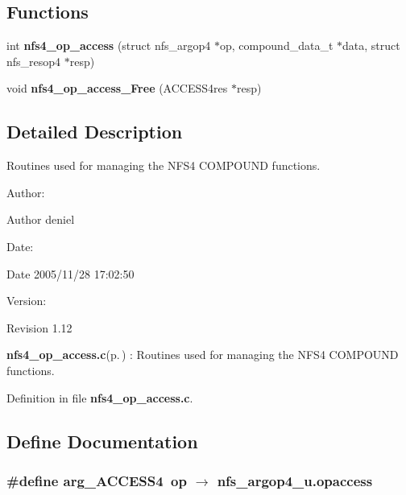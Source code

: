 \subsection*{Functions}
\begin{CompactItemize}
\item 
int {\bf nfs4\_\-op\_\-access} (struct nfs\_\-argop4 $\ast$op, compound\_\-data\_\-t $\ast$data, struct nfs\_\-resop4 $\ast$resp)
\item 
void {\bf nfs4\_\-op\_\-access\_\-Free} (ACCESS4res $\ast$resp)
\end{CompactItemize}


\subsection{Detailed Description}
Routines used for managing the NFS4 COMPOUND functions. 

\begin{Desc}
\item[Author:]\begin{Desc}
\item[Author]deniel \end{Desc}
\end{Desc}
\begin{Desc}
\item[Date:]\begin{Desc}
\item[Date]2005/11/28 17:02:50 \end{Desc}
\end{Desc}
\begin{Desc}
\item[Version:]\begin{Desc}
\item[Revision]1.12 \end{Desc}
\end{Desc}
{\bf nfs4\_\-op\_\-access.c}{\rm (p.\,\pageref{nfs4__op__access_8c})} : Routines used for managing the NFS4 COMPOUND functions.

Definition in file {\bf nfs4\_\-op\_\-access.c}.

\subsection{Define Documentation}
\subsubsection{\setlength{\rightskip}{0pt plus 5cm}\#define arg\_\-ACCESS4\ op $\rightarrow$ nfs\_\-argop4\_\-u.opaccess}\label{nfs4__op__access_8c_a0}


